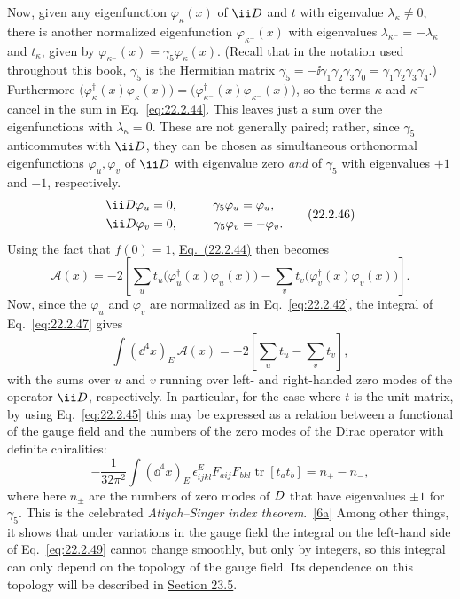 Now, given any eigenfunction $\varphi_\kappa(x)$ of $\ii\sl{D}$ and $t$ with
eigenvalue $\lambda_\kappa\ne0$, there is another normalized eigenfunction
$\varphi_{\kappa^-}(x)$ with eigenvalues
$\lambda_{\kappa^-}=-\lambda_\kappa$ and $t_\kappa$, given by
$\varphi_{\kappa^-}(x)=\gamma_5\varphi_\kappa(x)$. (Recall that in the
notation used throughout this book, $\gamma_5$ is the Hermitian matrix
$\gamma_5=-\ii\gamma_1\gamma_2\gamma_3\gamma_0
=\gamma_1\gamma_2\gamma_3\gamma_4$.) Furthermore
$\bigl(\varphi_\kappa^\dagger(x)\varphi_\kappa(x)\bigr)
=\bigl(\varphi_{\kappa^-}^\dagger(x)\varphi_{\kappa^-}(x)\bigr)$, so the
terms $\kappa$ and $\kappa^-$ cancel in the sum in
Eq.~\eqref{eq:22.2.44}. This leaves just a sum over the eigenfunctions with
$\lambda_\kappa=0$. These are not generally paired; rather, since
$\gamma_5$ anticommutes with $\ii\sl{D}$, they can be chosen as simultaneous
orthonormal eigenfunctions $\varphi_u,\varphi_v$ of $\ii\sl{D}$ with
eigenvalue zero \emph{and} of $\gamma_5$ with eigenvalues $+1$ and $-1$,
respectively.
\begin{equation}
 \begin{aligned}
 \ii\sl{D}\varphi_u&=0,&\qquad \gamma_5\varphi_u&=\varphi_u,\\
 \ii\sl{D}\varphi_v&=0,& \gamma_5\varphi_v&=-\varphi_v.
 \end{aligned}
 \tag{22.2.46}\label{eq:22.2.46}
\end{equation}
Using the fact that $f(0)=1$,
\hyperref[eq:22.2.44]{Eq.~(22.2.44)} then becomes
\begin{equation}
 \mathcal A(x)=-2\left[
 \sum_u t_u\bigl(\varphi_u^\dagger(x)\varphi_u(x)\bigr)
 -\sum_v t_v\bigl(\varphi_v^\dagger(x)\varphi_v(x)\bigr)
 \right].
 \tag{22.2.47}\label{eq:22.2.47}
\end{equation}
Now, since the $\varphi_u$ and $\varphi_v$ are normalized as in
Eq.~\eqref{eq:22.2.42}, the integral of Eq.~\eqref{eq:22.2.47} gives
\begin{equation}
 \int(\dd^4x)_E\,\mathcal A(x)
 =-2\left[\sum_u t_u-\sum_v t_v\right],
 \tag{22.2.48}\label{eq:22.2.48}
\end{equation}
with the sums over $u$ and $v$ running over left- and right-handed zero
modes of the operator $\ii\sl{D}$, respectively. In particular, for the case
where $t$ is the unit matrix, by using Eq.~\eqref{eq:22.2.45} this may be
expressed as a relation between a functional of the gauge field and the
numbers of the zero modes of the Dirac operator with definite chiralities:
\begin{equation}
 -\frac{1}{32\pi^2}\int(\dd^4x)_E\,\epsilon^E_{ijkl}
 F_{a ij}F_{b kl}\operatorname{tr}[t_a t_b]
 =n_+-n_-,
 \tag{22.2.49}\label{eq:22.2.49}
\end{equation}
where here $n_\pm$ are the numbers of zero modes of $\sl{D}$ that have
eigenvalues $\pm1$ for $\gamma_5$. This is the celebrated
\emph{Atiyah--Singer index theorem}.~\hyperref[ch22-ref-6a]{[6a]} Among
other things, it shows that under variations in the gauge field the integral
on the left-hand side of Eq.~\eqref{eq:22.2.49} cannot change smoothly,
but only by integers, so this integral can only depend on the topology of
the gauge field. Its dependence on this topology will be described in
\hyperref[sec:23.5]{Section 23.5}.
